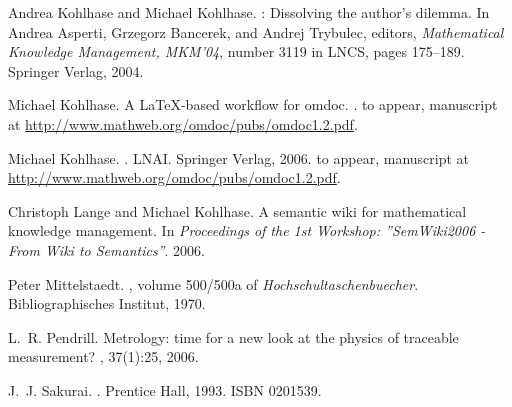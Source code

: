 \documentclass{llncs}
\def\LNCS{LNCS}
\begin{document}
\begin{thebibliography}{Koh06b}
Andrea Kohlhase and Michael Kohlhase.
: Dissolving the author's dilemma.
\newblock In Andrea Asperti, Grzegorz Bancerek, and Andrej Trybulec, editors,
  {\em Mathematical Knowledge Management, MKM'04}, number 3119 in \LNCS, pages
  175--189. Springer Verlag, 2004.

Michael Kohlhase.
\newblock A {\LaTeX}-based workflow for omdoc.
\newblock  \cite{Kohlhase:omdoc1.2}.
\newblock to appear, manuscript at
  {\url{http://www.mathweb.org/omdoc/pubs/omdoc1.2.pdf}}.

Michael Kohlhase.
.
\newblock LNAI. Springer Verlag, 2006.
\newblock to appear, manuscript at
  {\url{http://www.mathweb.org/omdoc/pubs/omdoc1.2.pdf}}.

Christoph Lange and Michael Kohlhase.
\newblock A semantic wiki for mathematical knowledge management.
\newblock In {\em Proceedings of the 1st Workshop: ''SemWiki2006 - From Wiki to
  Semantics''}. 2006.

Peter Mittelstaedt.
, volume 500/500a of {\em
  Hochschultaschenbuecher}.
\newblock Bibliographisches Institut, 1970.

L.~R. Pendrill.
\newblock Metrology: time for a new look at the physics of traceable
  measurement?
, 37(1):25, 2006.

J.~J. Sakurai.
.
\newblock Prentice Hall, 1993.
\newblock ISBN 0201539.

\end{thebibliography}

\end{document}
